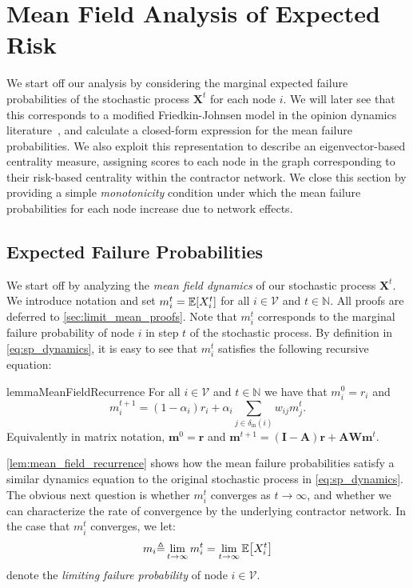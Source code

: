 \documentclass[mnsc,nonblindrev]{informs3}
\newcommand{\Exp}[1]{\mathbb E \left[ #1 \right]} %
\newcommand{\din}{\delta_{\text{in}}}
\newcommand{\Xvec}{\mathbf{X}}
\newcommand{\rvec}{\mathbf{r}}
\newcommand{\A}{\mathbf{A}}
\newcommand{\W}{\mathbf{W}}
\newcommand{\I}{\mathbf{I}}
\newcommand{\mean}{m}
\newcommand{\meanvec}{\mathbf{\mean}}
\newcommand{\FJ}{Friedkin-Johnsen\xspace}
\let\originalleft\left
\let\originalright\right
\renewcommand{\left}{\mathopen{}\mathclose\bgroup\originalleft}
\renewcommand{\right}{\aftergroup\egroup\originalright}
\begin{document}
\section{Mean Field Analysis of Expected Risk}
\label{sec:mean_field}

We start off our analysis by considering the marginal expected failure probabilities of the stochastic process $\Xvec^t$ for each node $i$.  We will later see that this corresponds to a modified \FJ model in the opinion dynamics literature~\citep{FriedkinJohnsen}, and calculate a closed-form expression for the mean failure probabilities.  We also exploit this representation to describe an eigenvector-based centrality measure, assigning scores to each node in the graph corresponding to their risk-based centrality within the contractor network.  We close this section by providing a simple {\em monotonicity} condition under which the mean failure probabilities for each node increase due to network effects.

\subsection{Expected Failure Probabilities}
\label{sec:mean_failure_probabilities}

We start off by analyzing the {\em mean field dynamics} of our stochastic process $\Xvec^t$.  We introduce notation and set $\mean_i^t = \Exp{X_i^t}$ for all $i \in \mathcal{V}$ and $t \in \mathbb{N}$.  All proofs are deferred to \cref{sec:limit_mean_proofs}. Note that $\mean_i^t$ corresponds to the marginal failure probability of node $i$ in step $t$ of the stochastic process.  By definition in \cref{eq:sp_dynamics}, it is easy to see that $\mean_i^t$ satisfies the following recursive equation:

\begin{restatable}{lemma}{MeanFieldRecurrence}
\label{lem:mean_field_recurrence}
For all $i \in \mathcal{V}$ and $t \in \mathbb{N}$ we have that $\mean_i^0 = r_i$ and
\begin{equation}
\label{eq:mean_field_recurrence}
    \mean_i^{t  + 1} = (1 - \alpha_i) r_i + \alpha_i \sum_{j \in \din(i)} w_{ij} \mean_j^{t}.
\end{equation}
Equivalently in matrix notation,  $\meanvec^0 = \rvec$ and \( \meanvec^{t + 1} = (\I - \A) \rvec + \A \W \meanvec^{t}\).
\end{restatable}


\cref{lem:mean_field_recurrence} shows how the mean failure probabilities satisfy a similar dynamics equation to the original stochastic process in \cref{eq:sp_dynamics}.  The obvious next question is whether $\mean_i^t$ converges as $t \rightarrow \infty$, and whether we can characterize the rate of convergence by the underlying contractor network.  In the case that $\mean_i^t$ converges, we let:
\begin{equation}
\label{eq:mean_field_limit}
\mean_i {\triangleq} \lim_{t \rightarrow \infty} \mean_i^t = \lim_{t \rightarrow \infty} \Exp{X_i^t}
\end{equation}
denote the {\em limiting failure probability} of node $i  \in \mathcal{V}$. 
\end{document}
